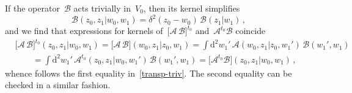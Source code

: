 \documentclass[a4paper,11pt]{article}
\numberwithin{equation}{section}
\begin{document}
If the operator~$\mathcal{B}$ acts trivially in~$V_0$, then its kernel simplifies
\begin{equation*}
	\mathcal{B}(z_0,z_1|w_0,w_1)=\delta^2(z_0-w_0)\,\mathcal{B}(z_1|w_1) \,,
\end{equation*}
and we find that expressions for kernels of~$\bigl[\mathcal{A}\,\mathcal{B}\bigr]^{t_0}$ and~$\mathcal{A}^{t_0} \mathcal{B}$ coincide
\begin{align*}
	&
	\bigl[\mathcal{A}\,\mathcal{B}\bigr]^{t_0}(z_0,z_1|w_0,w_1) 
	=
	\bigl[\mathcal{A}\,\mathcal{B}\bigr](w_0,z_1|z_0,w_1)
	= \int \mathrm{d}^2 w_1'\,\mathcal{A}(w_0,z_1|z_0,w_1')\,\mathcal{B}(w_1',w_1) \\
	& \qquad
	= \int \mathrm{d}^2 w_1' \, \mathcal{A}^{t_0}(z_0,z_1|w_0,w_1')\,\mathcal{B}(w_1',w_1) =
	\bigl[\mathcal{A}^{t_0} \mathcal{B}\bigr](z_0,z_1|w_0,w_1) \,,
\end{align*}
whence follows the first equality in~\eqref{transp-triv}. The second equality can be checked in a similar fashion.
\end{document}
